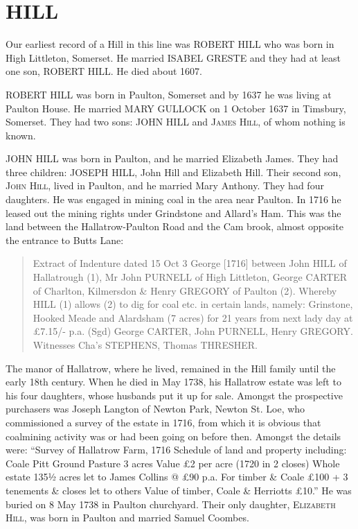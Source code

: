 \section{HILL}

Our earliest record of a Hill in this line was \uppercase{Robert Hill} who was born in High Littleton, Somerset. He married \uppercase{Isabel Greste} and they had at least one son, \uppercase{Robert Hill}. He died about 1607.

\uppercase{Robert Hill} was born in Paulton, Somerset and by 1637 he was living at Paulton House. He married \uppercase{Mary Gullock} on 1 October 1637 in Timsbury, Somerset.  They had two sons: \uppercase{John Hill} and \textsc{James Hill}, of whom nothing is known.

\uppercase{John Hill} was born in Paulton, and he married Elizabeth James.  They had three children: \uppercase{Joseph Hill}, John Hill and Elizabeth Hill.
Their second son, \textsc{John Hill}, lived in Paulton, and he married Mary Anthony. They had four daughters.  He was engaged in mining coal in the area near Paulton.  In 1716 he leased out the mining rights under Grindstone and Allard’s Ham. This was the land between the Hallatrow-Paulton Road and the Cam brook, almost opposite the entrance to Butts Lane:
\begin{quotation}
Extract of Indenture dated 15 Oct 3 George [1716] between John HILL of Hallatrough (1), Mr John PURNELL of High Littleton, George CARTER of Charlton, Kilmersdon \& Henry GREGORY of Paulton (2). Whereby HILL (1) allows (2) to dig for coal etc. in certain lands, namely: Grinstone, Hooked Meade and Alardsham (7 acres) for 21 years from next lady day at £7.15/- p.a. (Sgd) George CARTER, John PURNELL, Henry GREGORY. Witnesses Cha’s STEPHENS, Thomas THRESHER.
\end{quotation}
The manor of Hallatrow, where he lived, remained in the Hill family until the early 18th century. When he died in May 1738,  his Hallatrow estate was left to his four daughters, whose husbands put it up for sale. Amongst the prospective purchasers was Joseph Langton of Newton Park, Newton St. Loe, who commissioned a survey of the estate in 1716, from which it is obvious that coalmining activity was or had been going on before then. Amongst the details were: ``Survey of Hallatrow Farm, 1716 Schedule of land and property including: Coale Pitt Ground Pasture 3 acres Value £2 per acre (1720 in 2 closes) Whole estate 135½ acres let to James Collins @ £90 p.a. For timber \& Coale £100 + 3 tenements \& closes let to others Value of timber, Coale \& Herriotts £10.''
He was buried on 8 May 1738 in Paulton churchyard.
Their only daughter, \textsc{Elizabeth Hill},  was born in Paulton and married Samuel Coombes.

